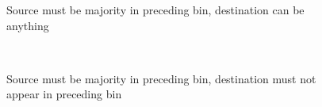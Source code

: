 \begin{figure*}[h]
	\centering
	\begin{subfigure}{.49\textwidth}
	    \def\svgwidth{\textwidth}
	    \small
	    
	    \caption{Source must be majority in preceding bin, destination can be anything}
	    \label{fig:substitution-modelled-majority-all}
	\end{subfigure}
	~
	\begin{subfigure}{.49\textwidth}
	    \def\svgwidth{\textwidth}
	    \small
	    
	    \caption{Source must be majority in preceding bin, destination must not appear in preceding bin}
	    \label{fig:substitution-modelled-majority-exclude_past}
	\end{subfigure}


\end{figure*}
